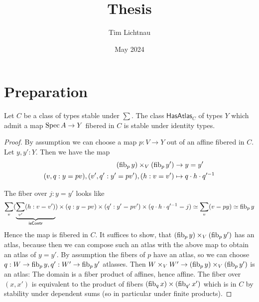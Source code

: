 \documentclass{article}
\title{Thesis}
\author{Tim Lichtnau }
\date{May 2024}
\begin{document}
\newtheorem*{warning}{warning}
\maketitle

\section{Preparation}
\begin{lemma}{\label{lemma:havingAbstractAtlasClosedUnderId}}
	Let $C$ be a class of types stable under $\sum$. %
	The class $\mathsf{HasAtlas}_C$ of types $Y$ which admit a map $\operatorname{Spec} A \to Y$ fibered in $C$ is stable under identity types. %
\end{lemma}
\begin{proof}
	
	By assumption we can choose a map $p : V \to Y$ out of an affine fibered in $C$. Let $y,y' : Y$.  Then we have the map
	\begin{align*}
		(\operatorname{fib}_p y) \times_V (\operatorname{fib}_p y') &\to y = y' \\
		(v , q : y = p v) , (v', q' : y' = p v') , (h : v = v') &\mapsto q \cdot h \cdot q'^{-1}
	\end{align*}
	
	The fiber over $j : y = y'$ looks like  %
	\[
	\sum_{v}  ( \underbrace{\sum_{v'} (h : v = v')}_{\mathsf{isContr}}) \times (q : y = p v) \times (q'  : y' = p v') \times (q \cdot h \cdot q'^{-1} = j) \simeq \sum_v (v = py) \simeq \operatorname{fib}_p y
	\]
	Hence the map is fibered in $C$. It suffices to show, that	$(\operatorname{fib}_p y) \times_V (\operatorname{fib}_p y')$ has an atlas, because then we can compose such an atlas with the above map to obtain an atlas of $y = y'$.
	By assumption the fibers of $p$ have an atlas, so we can choose $q : W \to \operatorname{fib}_p y, q' : W' \to \operatorname{fib}_p y'$ atlasses. Then $W \times_V W' \to (\operatorname{fib}_p y) \times_V (\operatorname{fib}_p y')$ is an atlas: The domain is a fiber product of affines, hence affine. The fiber over $(x,x')$ is equivalent to the product of fibers $(\operatorname{fib}_q x) \times (\operatorname{fib}_{q'} x')$ which is in $C$ by stability under dependent sums (so in particular under finite products).
	
\end{proof}
\end{document}
